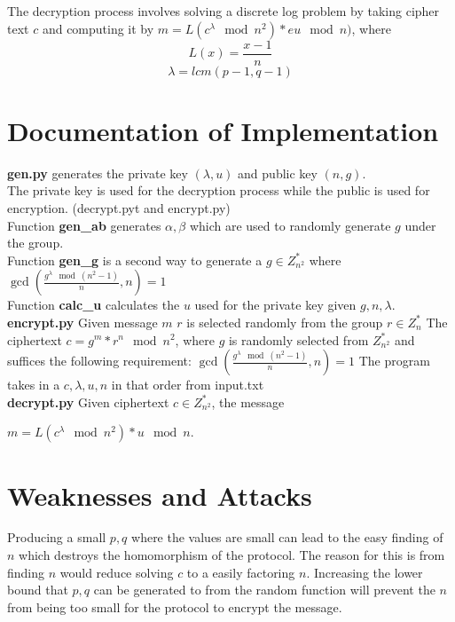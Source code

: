 \documentclass[12pt]{amsart}
\begin{document}
 The decryption process involves solving a discrete log problem by taking cipher
text $c$ and computing it by $m = L(c^{\lambda} \mod n^2) * eu \mod n)$, where
\[ L(x) = \frac{x-1}{n} \]
\[\lambda = lcm(p-1, q-1)\]

\section*{\textbf{Documentation of Implementation}}

\noindent \textbf{gen.py} generates the private key $(\lambda,u)$ and public key
$(n,g)$. \\ The private key is used for the decryption process while the public is used
for encryption. (decrypt.pyt and encrypt.py)\\

\indent Function \textbf{gen\_ab} generates $\alpha, \beta$ which are used to
randomly generate $g$ under the group. \\

\indent Function \textbf{gen\_g} is a second way to generate a $g \in Z_{n^2}^{*}$
where $\gcd(\frac{g^{\lambda} \mod (n^2 - 1)}{n}, n) = 1$ \\

\indent Function \textbf{calc\_u} calculates the $u$ used for the private key given
$g,n,\lambda$. \\

\noindent \textbf{encrypt.py} Given message $m$ $r$ is selected randomly from
the group $r \in Z_{n}^{*}$ The ciphertext $c = g^{m} * r^{n} \mod n^2$, where
$g$ is randomly selected from $Z_{n^2}^{*}$ and suffices the following requirement:
$\gcd(\frac{g^{\lambda} \mod (n^2 - 1)}{n}, n) = 1$ The program takes in a $c, \lambda,
u,n$ in that order from input.txt\\

\noindent \textbf{decrypt.py} Given ciphertext $c \in Z_{n^2}^{*}$, the message

$m = L(c^{\lambda} \mod n^2) * u \mod n$. \\


\section*{\textbf{Weaknesses and Attacks}}
Producing a small $p,q$ where the values are small can lead to the easy finding of
$n$ which destroys the homomorphism of the protocol. The reason for this is from
finding $n$ would reduce solving $c$ to a easily factoring $n$. Increasing
the lower bound that $p,q$ can be generated to from the random function will prevent
the $n$ from being too small for the protocol to encrypt the message. \\
\end{document}
